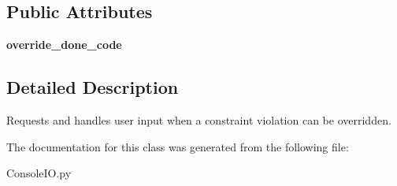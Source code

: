 \subsection*{Public Attributes}
\begin{DoxyCompactItemize}
\item 
\hypertarget{classConsoleIO_1_1Override__Dialog_a1a0207cdd4dd354bcf0d382b6e2f0ab9}{{\bfseries override\-\_\-done\-\_\-code}}\label{classConsoleIO_1_1Override__Dialog_a1a0207cdd4dd354bcf0d382b6e2f0ab9}

\end{DoxyCompactItemize}


\subsection{Detailed Description}
Requests and handles user input when a constraint violation can be overridden. 

The documentation for this class was generated from the following file\-:\begin{DoxyCompactItemize}
\item 
Console\-I\-O.\-py\end{DoxyCompactItemize}

